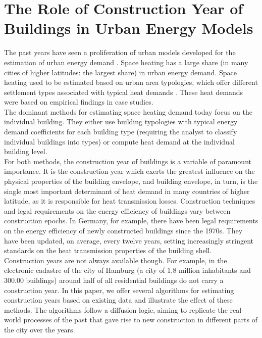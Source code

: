 \section{The Role of Construction Year of Buildings in Urban Energy Models}
 
The past years have seen a proliferation of urban models developed for the
estimation of urban energy demand
\citep{Calderon.2015,Mata.2014,MunozH.2014.IBPSA-JP,MunozH.2014.IJM,Chingcuanco.2012,Fracastoro.2011}.
Space heating has a large share (in many cities of higher latitudes: the
largest share) in urban energy demand. Space heating used to be estimated based
on urban area typologies, which offer different settlement types associated
with typical heat demands 
\citep{Roth.1980,Roth.1981,Blesl.2002,Everding.2004,Blesl.2007,Genske.2009,Erhorn.2011}.
These heat demands were based on empirical findings in case studies.\\
 
The dominant methods for estimating space heating demand today focus on the
individual building. They either use building typologies with typical energy
demand coefficients for each building type (requiring the analyst to classify
individual buildings into types) or compute heat demand at the individual
building level.\\
 
For both methods, the construction year of buildings is a variable of paramount
importance. It is the construction year which exerts the greatest influence on
the physical properties of the building envelope, and building envelope, in
turn, is the single most important determinant of heat demand in many countries
of higher latitude, as it is responsible for heat transmission losses.
Construction techniques and legal requirements on the energy efficiency of
buildings vary between construction epochs. In Germany, for example, there have
been legal requirements on the energy efficiency of newly constructed buildings
since the 1970s. They have been updated, on average, every twelve years,
setting increasingly stringent standards on the heat transmission properties of
the building shell.\\
 
Construction years are not always available though. For example, in the
electronic cadastre of the city of Hamburg (a city of 1,8 million inhabitants
and 300.00 buildings) around half of all residential buildings do not carry a
construction year. In this paper, we offer several algorithms for estimating
construction years based on existing data and illustrate the effect of these
methods. The algorithms follow a diffusion logic, aiming to replicate the
real-world processes of the past that gave rise to new construction in
different parts of the city over the years.\\

